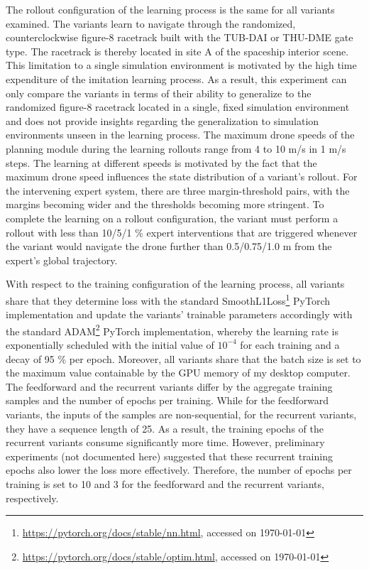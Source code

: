 The rollout configuration of the learning process
is the same for all variants examined.
The variants learn to navigate through 
the randomized, counterclockwise figure-8 racetrack
built with the TUB-DAI or THU-DME gate type.
The racetrack is thereby located in
site A of the spaceship interior scene.
This limitation to a single simulation environment
is motivated by the 
high time expenditure of the imitation learning process.
As a result,
this experiment can only compare the variants 
in terms of their ability to generalize 
to the randomized figure-8 racetrack
located in a single, fixed simulation environment
and does not provide insights 
regarding the generalization to simulation environments 
unseen in the learning process.
The maximum drone speeds of the planning module
during the learning rollouts
range from 4 to 10 m/s in 1 m/s steps.
The learning at different speeds is motivated
by the fact that the maximum drone speed 
influences the state distribution of a variant's rollout.
For the intervening expert system, 
there are three margin-threshold pairs, 
with the margins becoming wider 
and the thresholds becoming more stringent.
To complete the learning on a rollout configuration,
the variant must perform a rollout 
with less than 10/5/1 \% expert interventions
that are triggered whenever the variant
would navigate the drone further than 0.5/0.75/1.0 m
from the expert's global trajectory.

With respect to the training configuration of the learning process,
all variants share that they 
determine loss with
the standard 
SmoothL1Loss\footnote{\url{https://pytorch.org/docs/stable/nn.html}, accessed on \today}
PyTorch implementation
and update the variants' trainable parameters accordingly 
with the standard 
ADAM\footnote{\url{https://pytorch.org/docs/stable/optim.html}, accessed on \today}
PyTorch implementation,
whereby the learning rate is exponentially scheduled
with the initial value of $10^{-4}$ for each training and a decay of 
95 \% per epoch.
Moreover, all variants share that the batch size 
is set to the maximum value containable by
the GPU memory of my desktop computer.
The feedforward and the recurrent variants differ 
by the aggregate training samples
and the number of epochs per training.
While for the feedforward variants,
the inputs of the samples are non-sequential,
for the recurrent variants,
they have a sequence length of 25.
As a result, the training epochs of the
recurrent variants consume significantly more time.
However, preliminary experiments 
(not documented here)
suggested that these recurrent training epochs 
also lower the loss more effectively.
Therefore, the number of epochs per training
is set to 10 and 3 for the feedforward
and the recurrent variants, respectively.

